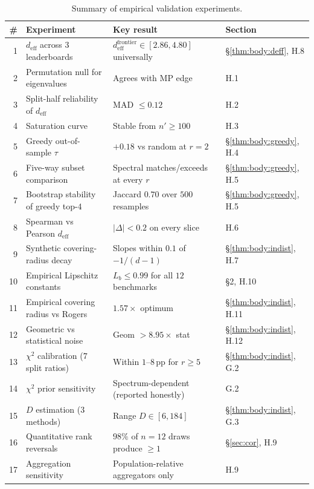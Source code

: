 \documentclass{article}
\begin{document}
\begin{table}[h]
\small\centering
\caption{Summary of empirical validation experiments.}
\label{tab:s1}
\begin{tabular}{rlll}
\toprule
\# & Experiment & Key result & Section \\
\midrule
 1 & $d_{\mathrm{eff}}$ across $3$ leaderboards & $d_{\mathrm{eff}}^{\mathrm{frontier}} \in [2.86, 4.80]$ universally & \S\ref{thm:body:deff}, H.8 \\
 2 & Permutation null for eigenvalues & Agrees with MP edge & H.1 \\
 3 & Split-half reliability of $d_{\mathrm{eff}}$ & MAD $\le 0.12$ & H.2 \\
 4 & Saturation curve & Stable from $n' \ge 100$ & H.3 \\
 5 & Greedy out-of-sample $\tau$ & $+0.18$ vs random at $r = 2$ & \S\ref{thm:body:greedy}, H.4 \\
 6 & Five-way subset comparison & Spectral matches/exceeds at every $r$ & \S\ref{thm:body:greedy}, H.5 \\
 7 & Bootstrap stability of greedy top-$4$ & Jaccard $0.70$ over $500$ resamples & \S\ref{thm:body:greedy}, H.5 \\
 8 & Spearman vs Pearson $d_{\mathrm{eff}}$ & $|\Delta| < 0.2$ on every slice & H.6 \\
 9 & Synthetic covering-radius decay & Slopes within $0.1$ of $-1/(d-1)$ & \S\ref{thm:body:indist}, H.7 \\
10 & Empirical Lipschitz constants & $L_b \le 0.99$ for all $12$ benchmarks & \S2, H.10 \\
11 & Empirical covering radius vs Rogers & $1.57\times$ optimum & \S\ref{thm:body:indist}, H.11 \\
12 & Geometric vs statistical noise & Geom $> 8.95\times$ stat & \S\ref{thm:body:indist}, H.12 \\
13 & $\chi^2$ calibration ($7$ split ratios) & Within $1$--$8$\,pp for $r \ge 5$ & \S\ref{thm:body:indist}, G.2 \\
14 & $\chi^2$ prior sensitivity & Spectrum-dependent (reported honestly) & G.2 \\
15 & $D$ estimation ($3$ methods) & Range $D \in [6, 184]$ & \S\ref{thm:body:indist}, G.3 \\
16 & Quantitative rank reversals & $98\%$ of $n=12$ draws produce $\ge 1$ & \S\ref{sec:cor}, H.9 \\
17 & Aggregation sensitivity & Population-relative aggregators only & H.9 \\

\end{tabular}
\end{table}
\end{document}
